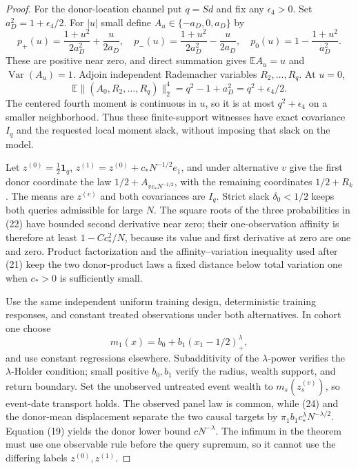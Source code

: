 \documentclass{article}
\begin{document}
\begin{proof}
For the donor-location channel put \(q=Sd\) and fix any
\(\epsilon_4>0\).  Set \(a_D^2=1+\epsilon_4/2\).  For \(|u|\) small define
\(A_u\in\{-a_D,0,a_D\}\) by
\[
 p_+(u)=\frac{1+u^2}{2a_D^2}+\frac{u}{2a_D},\quad
 p_-(u)=\frac{1+u^2}{2a_D^2}-\frac{u}{2a_D},\quad
 p_0(u)=1-\frac{1+u^2}{a_D^2}.                                \tag{22}
\]
These are positive near zero, and direct summation gives
\(\mathbb EA_u=u\) and \(\operatorname{Var}(A_u)=1\).  Adjoin independent
Rademacher variables \(R_2,\ldots,R_q\).  At \(u=0\),
\[
 \mathbb E\|(A_0,R_2,\ldots,R_q)\|_2^4
 =q^2-1+a_D^2=q^2+\epsilon_4/2.                               \tag{23}
\]
The centered fourth moment is continuous in \(u\), so it is at most
\(q^2+\epsilon_4\) on a smaller neighborhood.  Thus these finite-support
witnesses have exact covariance \(I_q\) and the requested local moment
slack, without imposing that slack on the model.

Let \(z^{(0)}=\tfrac12\mathbf1_q\),
\(z^{(1)}=z^{(0)}+c_*N^{-1/2}e_1\), and under alternative \(v\) give the
first donor coordinate the law \(1/2+A_{vc_*N^{-1/2}}\), with the remaining
coordinates \(1/2+R_k\).  The means are \(z^{(v)}\) and both covariances are
\(I_q\).  Strict slack \(\delta_0<1/2\) keeps both queries admissible for
large \(N\).  The square roots of the three probabilities in (22) have
bounded second derivative near zero; their one-observation affinity is
therefore at least \(1-Cc_*^2/N\), because its value and first derivative at
zero are one and zero.  Product factorization and the affinity--variation
inequality used after (21) keep the two donor-product laws a fixed distance
below total variation one when \(c_*>0\) is sufficiently small.

Use the same independent uniform training design, deterministic training
responses, and constant treated observations under both alternatives.  In
cohort one choose
\[
 m_1(x)=b_0+b_1(x_1-1/2)_+^\lambda,                           \tag{24}
\]
and use constant regressions elsewhere.  Subadditivity of the
\(\lambda\)-power verifies the \(\lambda\)-Holder condition; small positive
\(b_0,b_1\) verify the radius, wealth support, and return boundary.  Set the
unobserved untreated event wealth to \(m_s(z_s^{(v)})\), so event-date
transport holds.  The observed panel law is common, while (24) and the
donor-mean displacement separate the two causal targets by
\(\pi_1b_1c_*^\lambda N^{-\lambda/2}\).  Equation (19) yields the donor
lower bound \(cN^{-\lambda}\).  The infimum in the theorem must use one
observable rule before the query supremum, so it cannot use the differing
labels \(z^{(0)},z^{(1)}\).


\end{proof}
\end{document}
